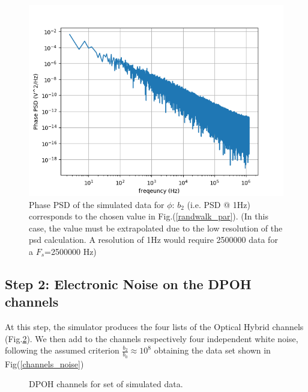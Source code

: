 \documentclass[ fontsize=11pt]{scrartcl} %
\numberwithin{equation}{section} %
\numberwithin{figure}{section} %
\numberwithin{table}{section} %
\begin{document}
\begin{figure}[hbtp]
\centering
\includegraphics[scale=0.8]{immagini_noise/PSD_phi.png}
\caption{Phase PSD of the simulated data for $\phi$: $b_2$ (i.e. PSD @ 1Hz) corresponds to the chosen value in Fig.(\ref{randwalk_par}). (In this case, the value must be extrapolated due to the low resolution of the psd calculation. A resolution of 1Hz would require 2500000 data for a $F_s$=2500000 Hz)}
\label{PSD_phi}
\end{figure}

\subsection{Step 2: Electronic Noise on the DPOH channels}

At this step, the simulator produces the four lists of the Optical Hybrid channels (Fig.\ref{channels}). We then add to the channels respectively four independent white noise, following the assumed criterion $\frac{b_2}{b_0} \approx 10^{8}$ obtaining the data set shown in Fig(\ref{channels_noise})

\begin{center}
\begin{figure}[hbtp]
\caption{DPOH channels for set of simulated data.}
\label{channels}
\end{figure}
\end{center}
\end{document}
